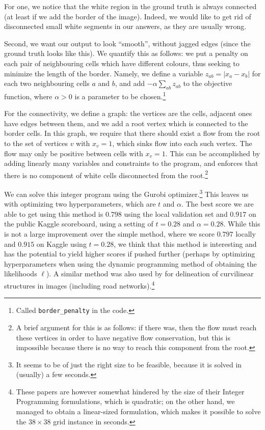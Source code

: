 \documentclass[10pt,conference,compsocconf]{IEEEtran}
\begin{document}
For one, we notice that the white region in the ground truth is always connected (at least if we add the border of the image). Indeed, we would like to get rid of disconnected small white segments in our answers, as they are usually wrong.

Second, we want our output to look ``smooth'', without jagged edges (since the ground truth looks like this). We quantify this as follows: we put a penalty on each pair of neighbouring cells which have different colours, thus seeking to minimize the length of the border. Namely, we define a variable $z_{ab} = |x_a - x_b|$ for each two neighbouring cells $a$ and $b$, and add $- \alpha \sum_{ab} z_{ab}$ to the objective function, where $\alpha > 0$ is a parameter to be chosen.\footnote{Called \texttt{border\_penalty} in the code.}

For the connectivity, we define a graph: the vertices are the cells, adjacent ones have edges between them, and we add a root vertex which is connected to the border cells. In this graph, we require that there should exist a flow from the root to the set of vertices $v$ with $x_v = 1$, which sinks flow into each such vertex. The flow may only be positive between cells with $x_v = 1$. This can be accomplished by adding linearly many variables and constraints to the program, and enforces that there is no component of white cells disconnected from the root.\footnote{A brief argument for this is as follows: if there was, then the flow must reach these vertices in order to have negative flow conservation, but this is impossible because there is no way to reach this component from the root.}

We can solve this integer program using the Gurobi optimizer.\footnote{It seems to be of just the right size to be feasible, because it is solved in (usually) a few seconds.} This leaves us with optimizing two hyperparameters, which are $t$ and $\alpha$. The best score we are able to get using this method is $0.798$ using the local validation set and $0.917$ on the public Kaggle scoreboard, using a setting of $t = 0.28$ and $\alpha = 0.28$. While this is not a large improvement over the simple method, where we score $0.797$ locally and $0.915$ on Kaggle using $t = 0.28$, we think that this method is interesting and has the potential to yield higher scores if pushed further (perhaps by optimizing hyperparameters when using the dynamic programming method of obtaining the likelihoods $\ell$). A similar method was also used by \cite{turetken2013reconstructing,turetken2016reconstructing} for delineation of curvilinear structures in images (including road networks).\footnote{These papers are however somewhat hindered by the size of their Integer Programming formulations, which is quadratic; on the other hand, we managed to obtain a linear-sized formulation, which makes it possible to solve the $38 \times 38$ grid instance in seconds.}








\end{document}
